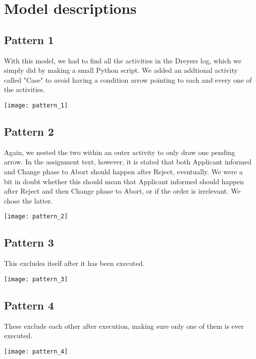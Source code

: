 \section*{Model descriptions}

\subsection*{Pattern 1}
With this model, we had to find all the activities in the Dreyers log, which we simply did by
making a small Python script. We added an addtional activity called "Case" to avoid having
a condition arrow pointing to each and every one of the activities.
\begin{center}
    \texttt{[image: pattern\_1]}
\end{center}	

\newpage
\subsection*{Pattern 2}
Again, we nested the two within an outer activity to only draw one pending arrow.
In the assignment text, however, it is stated that both Applicant informed and Change phase to
Abort should happen after Reject, eventually. We were a bit in doubt whether this should mean that
Applicant informed should happen after Reject and then Change phase to Abort, or if the order is
irrelevant. We chose the latter.
\begin{center}
    \texttt{[image: pattern\_2]}
\end{center}	

\subsection*{Pattern 3}
This excludes itself after it has been executed.
\begin{center}
    \texttt{[image: pattern\_3]}
\end{center}	

\subsection*{Pattern 4}
These exclude each other after execution, making sure only one of them is ever executed.
\begin{center}
    \texttt{[image: pattern\_4]}
\end{center}	

